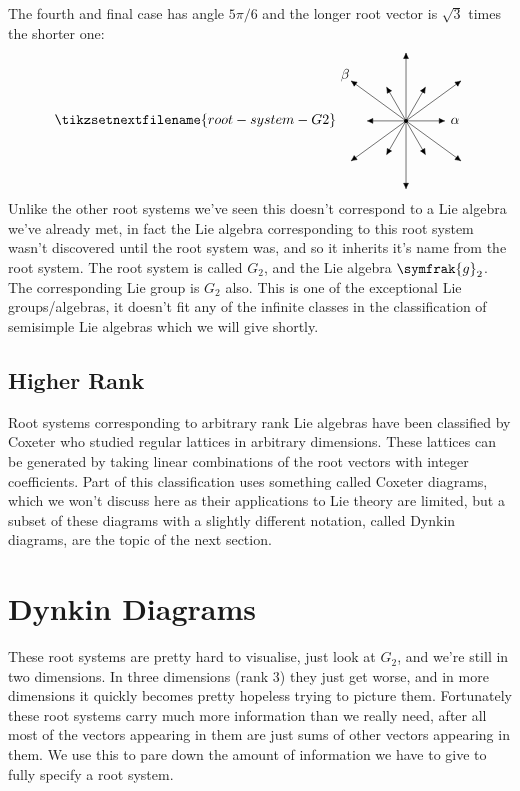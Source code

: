 \documentclass[fleqn]{NotesClass}
\renewcommand{\lie}[1]{\symfrak{#1}}
\begin{document}
    The fourth and final case has angle \(5\pi/6\) and the longer root vector is \(\sqrt{3}\) times the shorter one:
    \begin{equation}
        \tikzsetnextfilename{root-system-G2}
        \begin{tikzpicture}[
            baseline = (alpha.base),
            >={Latex[width=1.5mm]}
            ]
            \draw[->] (0, 0) -- (0:1) node (alpha) [right] {\(\alpha\)};
            \draw[->] (0, 0) -- (60:1);
            \draw[->] (0, 0) -- (120:1);
            \draw[->] (0, 0) -- (180:1);
            \draw[->] (0, 0) -- (240:1);
            \draw[->] (0, 0) -- (300:1);
            \draw[->] (0, 0) -- (36:{sqrt(3)});
            \draw[->] (0, 0) -- (-36:{sqrt(3)});
            \draw[->] (0, 0) -- (144:{sqrt(3)}) node [above left, shift={(0.1, -0.15)}] {\(\beta\)};
            \draw[->] (0, 0) -- (-144:{sqrt(3)});
            \draw[->] (0, 0) -- (90:{sqrt(3)});
            \draw[->] (0, 0) -- (-90:{sqrt(3)});
            \fill (0, 0) circle [radius = 0.05];
        \end{tikzpicture}
    \end{equation}
    Unlike the other root systems we've seen this doesn't correspond to a Lie algebra we've already met, in fact the Lie algebra corresponding to this root system wasn't discovered until the root system was, and so it inherits it's name from the root system.
    The root system is called \(G_2\), and the Lie algebra \(\lie{g}_2\).
    The corresponding Lie group is \(G_2\) also.
    This is one of the exceptional Lie groups/algebras, it doesn't fit any of the infinite classes in the classification of semisimple Lie algebras which we will give shortly.
    
    \subsection{Higher Rank}
    Root systems corresponding to arbitrary rank Lie algebras have been classified by Coxeter who studied regular lattices in arbitrary dimensions.
    These lattices can be generated by taking linear combinations of the root vectors with integer coefficients.
    Part of this classification uses something called Coxeter diagrams, which we won't discuss here as their applications to Lie theory are limited, but a subset of these diagrams with a slightly different notation, called Dynkin diagrams, are the topic of the next section.
    
    \section{Dynkin Diagrams}
    These root systems are pretty hard to visualise, just look at \(G_2\), and we're still in two dimensions.
    In three dimensions (rank 3) they just get worse, and in more dimensions it quickly becomes pretty hopeless trying to picture them.
    Fortunately these root systems carry much more information than we really need, after all most of the vectors appearing in them are just sums of other vectors appearing in them.
    We use this to pare down the amount of information we have to give to fully specify a root system.
    
\end{document}
